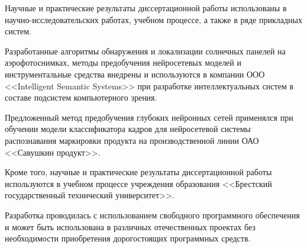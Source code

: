 
Научные и практические результаты диссертационной работы использованы в научно-исследовательских работах, учебном процессе, а также в ряде прикладных систем.

Разработанные алгоритмы обнаружения и локализации солнечных панелей на аэрофотоснимках, методы предобучения нейросетевых моделей и инструментальные средства внедрены и используются в компании ООО <<Intelligent Semantic Systems>> при разработке интеллектуальных систем в составе подсистем компьютерного зрения.

Предложенный метод предобучения глубоких нейронных сетей применялся при обучении модели классификатора кадров для нейросетевой системы распознавания маркировки продукта на производственной линии ОАО <<Савушкин продукт>>.

Кроме того, научные и практические результаты диссертационной работы используются в учебном процессе учреждения образования <<Брестский государственный технический университет>>.


Разработка проводилась с использованием свободного программного обеспечения и может быть использована в различных отечественных проектах без необходимости приобретения дорогостоящих программных средств.

